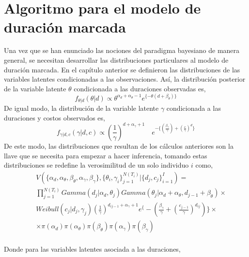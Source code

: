 \section{Algoritmo para el modelo de duraci\'on marcada}
Una vez que se han enunciado las nociones del paradigma bayesiano de manera general, se necesitan desarrollar las distribuciones particulares al modelo de duraci\'on marcada. En el cap\'itulo anterior se definieron las distribuciones de las variables latentes condicionadas a las observaciones. As\'i, la distribuci\'on posterior de la variable latente $\theta$ condicionada a las duraciones observadas es,
\[f_{\theta|d}(\theta|d) \propto \theta^{\alpha_d+\alpha_\theta-1} e^{\{-\theta(d+\beta_\theta)\}}\]
De igual modo, la distribuci\'on de la variable latente $\gamma$ condicionada a las duraciones y costos observados es,
\[f_{\gamma|d,c}(\gamma|d,c) \propto \left(\frac{1}{\gamma}\right)^{d+\alpha_\gamma+1} \quad e^{-\{(\frac{\beta_\gamma}{\gamma})+(\frac{c}{\gamma})^d\}}\]
De este modo, las distribuciones que resultan de los c\'alculos anteriores son la llave que se necesita para empezar a hacer inferencia, tomando estas distribuciones se redefine la verosimilitud de un solo individuo $i$ como,
\begin{eqnarray*}
&&V(\{\alpha_d,\alpha_\theta,\beta_\theta,\alpha_\gamma,\beta_\gamma\},\{\theta_i,\gamma_i\}_{j=1}^{N(T_i)}|\{d_j,c_j\}_{i=1}^I)=\\ 
&&\prod_{j=1}^{N(T_i)} Gamma(d_j|\alpha_d,\theta_j) Gamma(\theta_j|\alpha_d+\alpha_\theta,d_{j-1}+\beta_\theta)\times \\
&&Weibull(c_j|d_j,\gamma_j)\left(\frac{1}{\gamma}\right)^{d_{ij-1}+\alpha_\gamma+1}e^\{-(\frac{\beta_\gamma}{\gamma}+(\frac{c_{j-1}}{\gamma})^{d_{ij}})\} \times \\
&&\times \pi(\alpha_d)\pi(\alpha_\theta)\pi(\beta_\theta)\pi(\alpha_\gamma)\pi(\beta_\gamma)
\end{eqnarray*}
\\
Donde para las variables latentes asociada a las duraciones,
